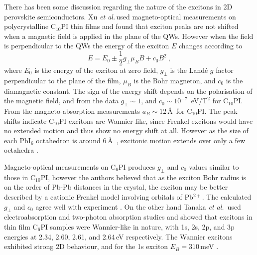 There has been some discussion regarding the nature of the excitons in 2D perovskite semiconductors. Xu \textit{et al.}\,used magneto-optical measurements on polycrystalline $\textrm{C}_{10}$PI thin films and found that exciton peaks are not shifted when a magnetic field is applied in the plane of the QWs. However when the field is perpendicular to the QWs the energy of the exciton $E$ changes according to
\begin{equation}
E = E_0 \pm \frac{1}{2} g_{\bot} \mu_{B} B + c_0 B^2~,
\label{mag-shift}
\end{equation} 
where $E_0$ is the energy of the exciton at zero field, $g_{\bot}$ is the Land\'{e} $g$ factor perpendicular to the plane of the film, $\mu_B$ is the Bohr magneton, and $c_0$ is the diamagnetic constant. The sign of the energy shift depends on the polarisation of the magnetic field, and from the data $g_{\bot}\sim1$, and $c_0\sim 10^{-7}$~eV/$\textrm{T}^2$ for C$_{10}$PI. From the magneto-absorption measurements $a_B \sim12\,$\AA\, for $\textrm{C}_{10}$PI. The peak shifts indicate $\textrm{C}_{10}$PI excitons are Wannier-like, since Frenkel excitons would have no extended motion and thus show no energy shift at all. However as the size of each $\textrm{PbI}_6$ octahedron is around 6\,\AA~\cite{Ishihara1990}, excitonic motion extends over only a few octahedra \cite{Xu1991b}.

Magneto-optical measurements on C$_6$PI produces $g_{\bot}$ and $c_0$ values similar to those in $\textrm{C}_{10}$PI, however the authors believed that as the exciton Bohr radius is on the order of Pb-Pb distances in the crystal, the exciton may be better described by a cationic Frenkel model involving orbitals of Pb$^{2+}$. The calculated $g_{\bot}$ and $c_0$ agree well with experiment \cite{Kataoka1993}. On the other hand Tanaka \textit{et al.}\ used electroabsorption and two-photon absorption studies and showed that excitons in thin film $\textrm{C}_{6}$PI samples were Wannier-like in nature, with 1s, 2s, 2p, and 3p energies at 2.34, 2.60, 2.61, and 2.64\,eV respectively. The Wannier excitons exhibited strong 2D behaviour, and for the 1s exciton $E_B = 310$\,meV \cite{Tanaka2002}.



